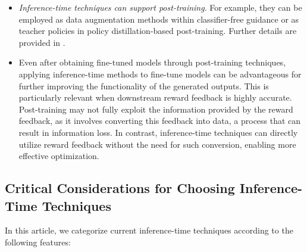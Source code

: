 \documentclass[12pt]{article} %
\begin{document}
{\begin{itemize}
\item \emph{Inference-time techniques can support post-training}. For example, they can be employed as data augmentation methods within classifier-free guidance or as teacher policies in policy distillation-based post-training. Further details are provided in .

\item Even after obtaining fine-tuned models through post-training techniques, applying inference-time methods to fine-tune models can be advantageous for further improving the functionality of the generated outputs. This is particularly relevant when downstream reward feedback is highly accurate. Post-training may not fully exploit the information provided by the reward feedback, as it involves converting this feedback into data, a process that can result in information loss. In contrast, inference-time techniques can directly utilize reward feedback without the need for such conversion, enabling more effective optimization.



\end{itemize}

\vspace{-2mm}
\subsection*{Critical Considerations for Choosing Inference-Time Techniques}
\vspace{-2mm}



In this article, we categorize current inference-time techniques according to the following features:

}
\end{document}
